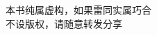 \begin{titlepage}
	\centering %
	\scshape %
	\vspace*{1.5\baselineskip} %

	
		\vspace{6\baselineskip} %
	{	
        \Huge \bookname
    }
		\vspace{5\baselineskip} %
	
	{\Large \authorname}
	{
	\vspace*{4\baselineskip}
	\\\bookdate\;\bookversionstring\\
	\authoraddress\\
	\authoremail\\
	\vspace*{0.5\baselineskip}
	\authorhomepage\\
	\vspace*{4\baselineskip}
	本书纯属虚构，如果雷同实属巧合\\
	\cczero\;不设版权，请随意转发分享
	}


\end{titlepage}
